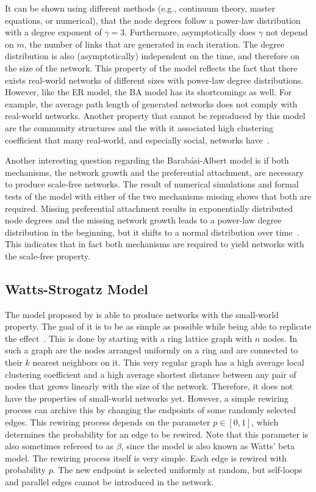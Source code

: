 It can be shown using different methods (e.g., continuum theory, master equations, or numerical), that the node degrees follow a power-law distribution with a degree exponent of \(\gamma = 3\).
Furthermore, asymptotically does \(\gamma\) not depend on \(m\), the number of links that are generated in each iteration.
The degree distribution is also (asymptotically) independent on the time, and therefore on the size of the network.
This property of the model reflects the fact that there exists real-world networks of different sizes with power-law degree distributions.
However, like the ER model, the BA model has its shortcomings as well.
For example, the average path length of generated networks does not comply with real-world networks.
Another property that cannot be reproduced by this model are the community structures and the with it associated high clustering coefficient that many real-world, and especially social, networks have~\cite{Reid2011}.

Another interesting question regarding the Barabási-Albert model is if both mechanisms, the network growth and the preferential attachment, are necessary to produce scale-free networks.
The result of numerical simulations and formal tests of the model with either of the two mechanisms missing shows that both are required.
Missing preferential attachment results in exponentially distributed node degrees and the missing network growth leads to a power-law degree distribution in the beginning, but it shifts to a normal distribution over time~\cite{Barabasi2002}.
This indicates that in fact both mechanisms are required to yield networks with the scale-free property.


\subsection{Watts-Strogatz Model}
\label{subsec:watts-strogatz-model}

The model proposed by \citet{Watts1998} is able to produce networks with the small-world property.
The goal of it is to be as simple as possible while being able to replicate the effect~\cite{Watts2004}.
This is done by starting with a ring lattice graph with \( n \) nodes.
In such a graph are the nodes arranged uniformly on a ring and are connected to their \( k \) nearest neighbors on it.
This very regular graph has a high average local clustering coefficient and a high average shortest distance between any pair of nodes that grows linearly with the size of the network.
Therefore, it does not have the properties of small-world networks yet.
However, a simple rewiring process can archive this by changing the endpoints of some randomly selected edges.
This rewiring process depends on the parameter \( p \in [0, 1] \), which determines the probability for an edge to be rewired.
Note that this parameter is also sometimes refereed to as \( \beta \), since the model is also known as Watts' beta model.
The rewiring process itself is very simple.
Each edge is rewired with probability \( p \).
The new endpoint is selected uniformly at random, but self-loops and parallel edges cannot be introduced in the network.


